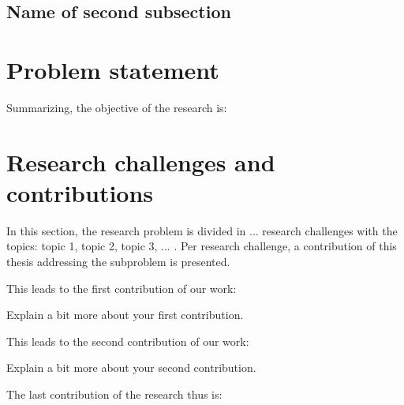 \lipsum[19-23]


\subsection{Name of second subsection}
\label{subsec: chap1 background3}

\lipsum[1-5]

\section{Problem statement}
\label{sec: chap1 prob statement}

\lipsum[6-8]
Summarizing, the objective of the research is:
\vspace*{3mm}


\section{Research challenges and contributions}
\label{sec: chap1 contributions}

In this section, the research problem is divided in ... research challenges with the topics: topic 1, topic 2, topic 3, ... . Per research challenge, a contribution of this thesis addressing the subproblem is presented.


\lipsum[1-2] This leads to the first contribution of our work:


Explain a bit more about your first contribution.


\lipsum[4-5] This leads to the second contribution of our work:


Explain a bit more about your second contribution.


\lipsum[1-2] The last contribution of the research thus is:


